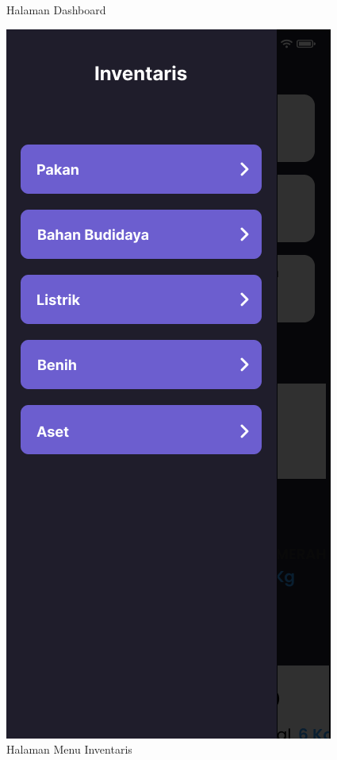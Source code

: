 \begin{enumerate}
\begin{enumerate}
\begin{figure}[H]
			  \caption{Halaman Dashboard}
			\endminipage\hfill
			  \includegraphics[width=\linewidth]{gambar/sprint1/mockup_home.png}
			  \caption{Halaman Menu Inventaris}
			\endminipage
		\end{figure}


\end{enumerate}
\end{enumerate}
